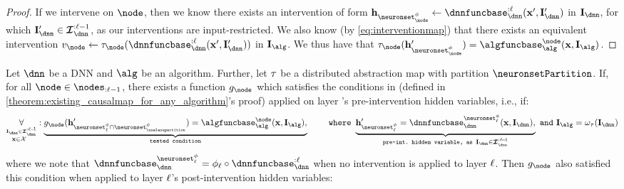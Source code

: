 \begin{proof}
    If we intervene on $\node$, then we know there exists an intervention of form $\hiddenstates_{\neuronset^{\causalmap}_{\node}} \leftarrow \dnnfunclayer{:\layer}(\bx', \interventionsdnn')$ in $\interventionsdnn$, for which $\interventionsdnn' \in \interventionsset^{:\layer-1}_{\dnn}$, as our interventions are input-restricted.
    We also know (by \cref{eq:interventionmap}) that there exists an equivalent intervention
    $\nodevalue_{\node} \leftarrow \abstractionmap_{\node}(\dnnfunclayer{:\layer}(\bx', \interventionsdnn'))$
    in $\interventionsalg$.
    We thus have that 
    $\abstractionmap_{\node}(\hiddenstates'_{\neuronset^{\causalmap}_{\node}}) = \algfuncnode{\node}(\bx, \interventions_{\alg})$.
\end{proof}

\begin{lemma}\label{lemma:post_intervention_third_condition}
    Let $\dnn$ be a DNN and $\alg$ be an algorithm.
    Further, let $\tau$ be a distributed abstraction map with partition $\neuronsetPartition$.
    If, for all $\node \in \nodes_{:\layer-1}$, there exists a function $g_\node$ which satisfies
    the conditions in  (defined in \cref{theorem:existing_causalmap_for_any_algorithm}'s proof) applied on layer \boldsymbol{$\layer$}'s pre-intervention hidden variables, i.e., if:
    \begin{align}
        \myforall_{\overset{\interventionsdnn \in \interventionsset^{:\layer\!-\!1}_{\dnn}}{\bx\in\calX\,\,\,\,}}:
        \underbrace{g_{\node}(\hiddenstates'_{\neuronset^{\causalmap}_{\layer} \cap \neuronset^{\causalmap}_{\uselesspartition}}) = \algfuncnode{\node}(\bx, \interventions_{\alg}),}_{\texttt{tested condition}} 
        \qquad\,\,\mathtt{where}\,\,
        \underbrace{\hiddenstates'_{\neuronset^{\causalmap}_{\layer}} =\dnnfunclayer{\neuronset^{\causalmap}_{\layer}}(\bx, \interventionsdnn),}_{\!\!\!\!\!\!\!\!\!\!\!\!\!\!\!\!\!\!\!\!\!\!\!\!\!\!\!\!\!\!\!\!\!\!\!\!\!\!\!\!\!\!\!\!\!\!\!\!
        \texttt{pre-int.\ hidden variable, as }\interventionsdnn \in \interventionsset^{:\layer\!-\!1}_{\dnn}
        \!\!\!\!\!\!\!\!\!\!\!\!\!\!\!\!\!\!\!\!\!\!\!\!\!\!\!\!\!\!\!\!\!\!\!\!\!\!\!\!\!\!\!\!\!\!\!\!}
        \,\,\mathtt{and}\,\,
        \interventions_{\alg} = \omega_{\abstractionmap}(\interventionsdnn)
    \end{align}
    where we note that $\dnnfunclayer{\neuronset^{\causalmap}_{\layer}} = \causalmap_{\layer} \circ \dnnfunclayer{:\layer}$ when no intervention is applied to layer $\layer$.
    Then $g_{\node}$ also satisfied this condition when applied to layer $\layer$'s post-intervention hidden variables:

\end{lemma}
